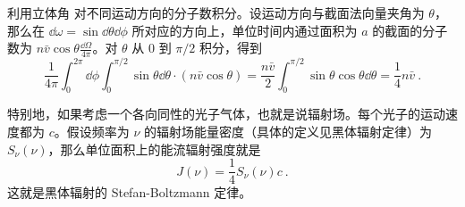 利用立体角 对不同运动方向的分子数积分。设运动方向与截面法向量夹角为 $\theta$，那么在 $\dd\omega=\sin\dd\theta\dd\phi$ 所对应的方向上，单位时间内通过面积为 $a$ 的截面的分子数为 $n\bar v\cos\theta \frac{\dd\Omega}{4\pi}$。对 $\theta$ 从 $0$ 到 $\pi/2$ 积分，得到
\begin{equation}
\frac{1}{4\pi}\int_0^{2\pi}\dd\phi\int_0^{\pi/2}\sin\theta\dd\theta \cdot (n \bar v\cos\theta)=\frac{n\bar v}{2} \int_0^{\pi/2}\sin\theta\cos\theta \dd\theta = \frac{1}{4} n\bar v ~.
\end{equation}

特别地，如果考虑一个各向同性的光子气体，也就是说辐射场。每个光子的运动速度都为 $c$。假设频率为 $\nu$ 的辐射场能量密度（具体的定义见黑体辐射定律）为 $S_\nu(\nu)$，那么单位面积上的能流辐射强度就是
\begin{equation}
J(\nu)=\frac{1}{4} S_\nu(\nu) c ~.
\end{equation}
这就是黑体辐射的 Stefan-Boltzmann 定律。
